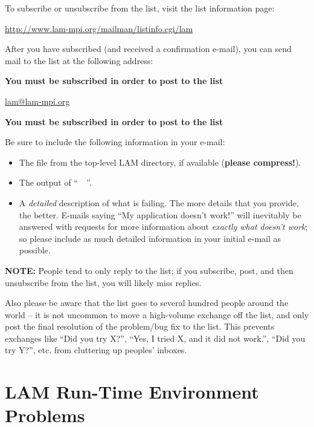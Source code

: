 To subscribe or unsubscribe from the list, visit the list information
page:

\vspace{11pt}
\centerline{\url{http://www.lam-mpi.org/mailman/listinfo.cgi/lam}}
\vspace{11pt}
  
After you have subscribed (and received a confirmation e-mail), you
can send mail to the list at the following address:
  
\vspace{11pt}
\centerline{{\bf You must be subscribed in order to post to the list}}
\centerline{\url{lam@lam-mpi.org}}
\centerline{{\bf You must be subscribed in order to post to the list}}
\vspace{11pt}

Be sure to include the following information in your e-mail:

\begin{itemize}
\item The  file from the top-level LAM directory, if
  available ({\bf please compress!}).
  
\item The output of ``\ \ ''.

\item A {\em detailed} description of what is failing.  The more
  details that you provide, the better.  E-mails saying ``My
  application doesn't work!'' will inevitably be answered with
  requests for more information about {\em exactly what doesn't work};
  so please include as much detailed information in your initial
  e-mail as possible.
\end{itemize}
  
{\bf NOTE:} People tend to only reply to the list; if you subscribe,
post, and then unsubscribe from the list, you will likely miss
replies.
  
Also please be aware that the list goes to several hundred people
around the world -- it is not uncommon to move a high-volume exchange
off the list, and only post the final resolution of the problem/bug
fix to the list.  This prevents exchanges like ``Did you try X?'',
``Yes, I tried X, and it did not work.'', ``Did you try Y?'', etc.
from cluttering up peoples' inboxes.


\section{LAM Run-Time Environment Problems}

